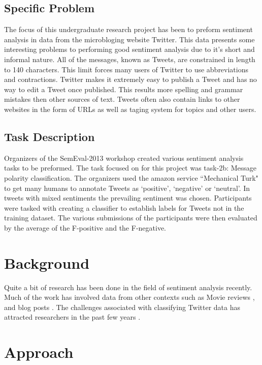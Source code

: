 \documentclass[12pt]{article}
\begin{document}

\subsection{Specific Problem}

The focus of this undergraduate research project has been to preform sentiment
analysis in data from the microbloging website Twitter. This data presents some
interesting problems to performing good sentiment analysis due to it's short
and informal nature. All of the messages, known as Tweets, are constrained in
length to 140 characters. This limit forces many users of Twitter to use
abbreviations and contractions. Twitter makes it extremely easy to publish a
Tweet and has no way to edit a Tweet once published. This results more spelling
and grammar mistakes then other sources of text. Tweets often also contain
links to other websites in the form of URLs as well as taging system for topics
and other users.

\subsection{Task Description}

Organizers of the SemEval-2013 workshop created various sentiment analysis
tasks to be preformed. The task focused on for this project was task-2b:
Message polarity classification. The organizers used the amazon service
``Mechanical Turk" to get many humans to annotate Tweets as `positive',
`negative' or `neutral'. In tweets with mixed sentiments the prevailing
sentiment was chosen. Participants were tasked with creating a classifier to
establish labels for Tweets not in the training dataset. The various
submissions of the participants were then evaluated by the average of the
F-positive and the F-negative.

\section{Background}

Quite a bit of research has been done in the field of sentiment analysis
recently. Much of the work has involved data from other contexts such as Movie
reviews \cite{Pang2002}, and blog posts \cite{Melville2009}. The challenges
associated with classifying Twitter data has attracted researchers in the past
few years \cite{Jianfeng2013} \cite{Barbosa2010} \cite{Gokulakrishnan2012}.

\section{Approach}
\end{document}
